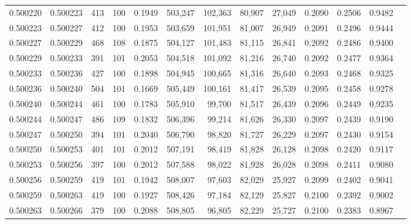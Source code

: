 \begin{tabular}{rrrrrrrrrrrrr}
0.500220 & 0.500223 &   413 & 100 &                                     0.1949 & 503,247 & 102,363 &  80,907 &  27,049 & 0.2090 & 0.2506 & 0.9482 \\
0.500223 & 0.500227 &   412 & 100 &                                     0.1953 & 503,659 & 101,951 &  81,007 &  26,949 & 0.2091 & 0.2496 & 0.9444 \\
0.500227 & 0.500229 &   468 & 108 &                                     0.1875 & 504,127 & 101,483 &  81,115 &  26,841 & 0.2092 & 0.2486 & 0.9400 \\
0.500229 & 0.500233 &   391 & 101 &                                     0.2053 & 504,518 & 101,092 &  81,216 &  26,740 & 0.2092 & 0.2477 & 0.9364 \\
0.500233 & 0.500236 &   427 & 100 &                                     0.1898 & 504,945 & 100,665 &  81,316 &  26,640 & 0.2093 & 0.2468 & 0.9325 \\
0.500236 & 0.500240 &   504 & 101 &                                     0.1669 & 505,449 & 100,161 &  81,417 &  26,539 & 0.2095 & 0.2458 & 0.9278 \\
0.500240 & 0.500244 &   461 & 100 &                                     0.1783 & 505,910 &  99,700 &  81,517 &  26,439 & 0.2096 & 0.2449 & 0.9235 \\
0.500244 & 0.500247 &   486 & 109 &                                     0.1832 & 506,396 &  99,214 &  81,626 &  26,330 & 0.2097 & 0.2439 & 0.9190 \\
0.500247 & 0.500250 &   394 & 101 &                                     0.2040 & 506,790 &  98,820 &  81,727 &  26,229 & 0.2097 & 0.2430 & 0.9154 \\
0.500250 & 0.500253 &   401 & 101 &                                     0.2012 & 507,191 &  98,419 &  81,828 &  26,128 & 0.2098 & 0.2420 & 0.9117 \\
0.500253 & 0.500256 &   397 & 100 &                                     0.2012 & 507,588 &  98,022 &  81,928 &  26,028 & 0.2098 & 0.2411 & 0.9080 \\
0.500256 & 0.500259 &   419 & 101 &                                     0.1942 & 508,007 &  97,603 &  82,029 &  25,927 & 0.2099 & 0.2402 & 0.9041 \\
0.500259 & 0.500263 &   419 & 100 &                                     0.1927 & 508,426 &  97,184 &  82,129 &  25,827 & 0.2100 & 0.2392 & 0.9002 \\
0.500263 & 0.500266 &   379 & 100 &                                     0.2088 & 508,805 &  96,805 &  82,229 &  25,727 & 0.2100 & 0.2383 & 0.8967 \\

\end{tabular}
